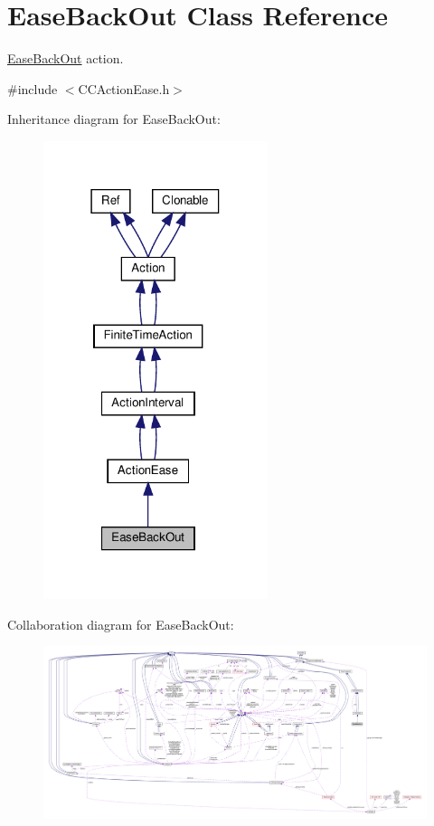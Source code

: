 \hypertarget{classEaseBackOut}{}\section{Ease\+Back\+Out Class Reference}
\label{classEaseBackOut}


\hyperlink{classEaseBackOut}{Ease\+Back\+Out} action.  




{\ttfamily \#include $<$C\+C\+Action\+Ease.\+h$>$}



Inheritance diagram for Ease\+Back\+Out\+:
\nopagebreak
\begin{figure}[H]
\begin{center}
\leavevmode
\includegraphics[width=186pt]{classEaseBackOut__inherit__graph}
\end{center}
\end{figure}


Collaboration diagram for Ease\+Back\+Out\+:
\nopagebreak
\begin{figure}[H]
\begin{center}
\leavevmode
\includegraphics[width=350pt]{classEaseBackOut__coll__graph}
\end{center}
\end{figure}
